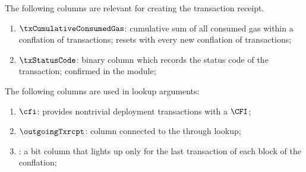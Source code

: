 The following columns are relevant for creating the transaction receipt.
\begin{enumerate}[resume]
	\item $\txCumulativeConsumedGas$:
		\markAsComputedHere{}
		cumulative sum of all consumed gas within a conflation of transactions;
		resets with every new conflation of transactions; 
	\item $\txStatusCode$:
		\markAsExtractedFromHub{}
		\godGiven{}
		binary column which records the status code of the transaction; confirmed in the \hubMod{} module;
\end{enumerate}
The following columns are used in lookup arguments: 
\begin{enumerate}[resume]
	\item $\cfi$:
		provides nontrivial deployment transactions with a $\CFI$; 
	\item $\outgoingTxrcpt$:
		column connected to the \rlpTxnRcptMod{} through lookup;
	\item \isLastTxOfBlock{}:
		a bit column that lights up only for the last transaction of each block of the conflation;
\end{enumerate}

